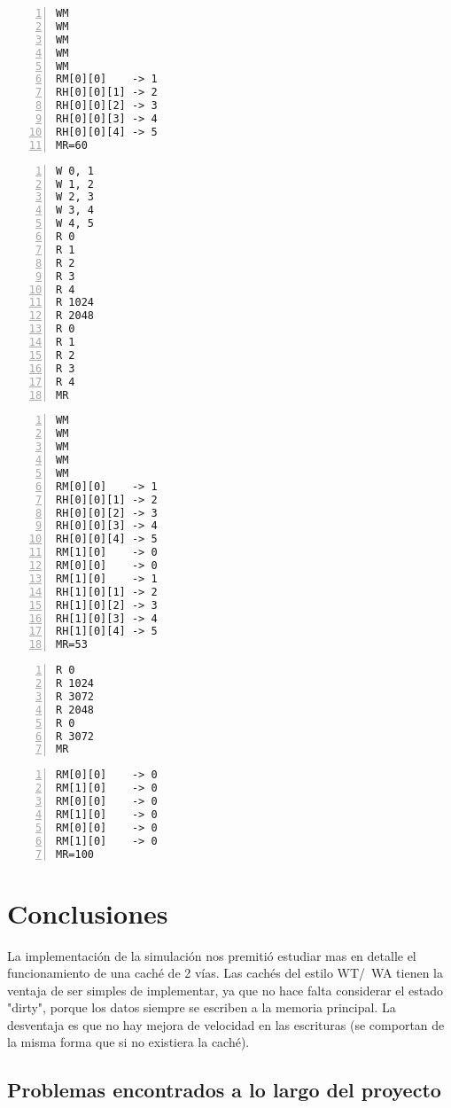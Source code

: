 \documentclass[11pt,a4paper]{article}
\begin{document}
\begin{lstlisting}[numbers=left, tabsize=2, basicstyle=\fontsize{11}{13}\ttfamily, frame=single, caption={Resultado prueba3.mem}]
WM
WM
WM
WM
WM
RM[0][0]    -> 1
RH[0][0][1] -> 2
RH[0][0][2] -> 3
RH[0][0][3] -> 4
RH[0][0][4] -> 5
MR=60
\end{lstlisting}

\begin{lstlisting}[numbers=left, tabsize=2, basicstyle=\fontsize{11}{13}\ttfamily, frame=single, caption={prueba4.mem}]
W 0, 1
W 1, 2
W 2, 3
W 3, 4
W 4, 5
R 0
R 1
R 2
R 3
R 4
R 1024
R 2048
R 0
R 1
R 2
R 3
R 4
MR
\end{lstlisting}

\begin{lstlisting}[numbers=left, tabsize=2, basicstyle=\fontsize{11}{13}\ttfamily, frame=single, caption={Resultado prueba4.mem}]
WM
WM
WM
WM
WM
RM[0][0]    -> 1
RH[0][0][1] -> 2
RH[0][0][2] -> 3
RH[0][0][3] -> 4
RH[0][0][4] -> 5
RM[1][0]    -> 0
RM[0][0]    -> 0
RM[1][0]    -> 1
RH[1][0][1] -> 2
RH[1][0][2] -> 3
RH[1][0][3] -> 4
RH[1][0][4] -> 5
MR=53
\end{lstlisting}

\begin{lstlisting}[numbers=left, tabsize=2, basicstyle=\fontsize{11}{13}\ttfamily, frame=single, caption={prueba5.mem}]
R 0
R 1024
R 3072
R 2048
R 0
R 3072
MR
\end{lstlisting}

\begin{lstlisting}[numbers=left, tabsize=2, basicstyle=\fontsize{11}{13}\ttfamily, frame=single, caption={Resultado prueba5.mem}]
RM[0][0]    -> 0
RM[1][0]    -> 0
RM[0][0]    -> 0
RM[1][0]    -> 0
RM[0][0]    -> 0
RM[1][0]    -> 0
MR=100
\end{lstlisting}

\section{Conclusiones}

La implementación de la simulación nos premitió estudiar mas en detalle el funcionamiento de una caché de 2 vías. Las cachés
del estilo WT/~WA tienen la ventaja de ser simples de implementar, ya que no hace falta considerar el estado "dirty",
porque los datos siempre se escriben a la memoria principal. La desventaja es que no hay mejora de velocidad en las
escrituras (se comportan de la misma forma que si no existiera la caché).


\subsection{Problemas encontrados a lo largo del proyecto}
\end{document}
